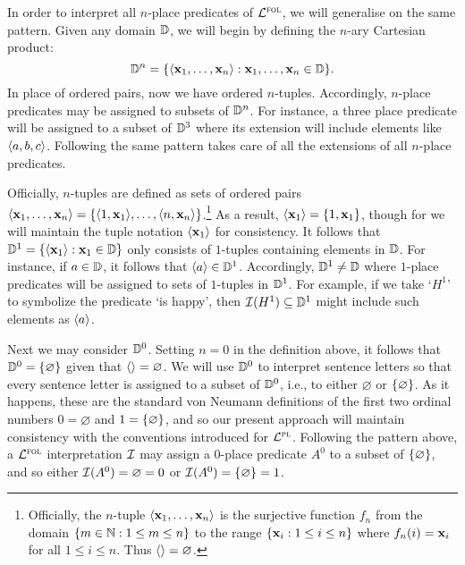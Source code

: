 In order to interpret all $n$-place predicates of $\mathcal{L}^{\textsc{fol}}$, we will generalise on the same pattern.
Given any domain $\mathbb{D}$, we will begin by defining the $n$-ary Cartesian product: 
  $$ \mathbb{D}^n = \lbrace\langle\mathbf{x}_1,\ldots,\mathbf{x}_n\rangle:\mathbf{x}_1,\ldots,\mathbf{x}_n\in\mathbb{D}\rbrace.$$ %
In place of ordered pairs, now we have ordered $n$-tuples.
Accordingly, $n$-place predicates may be assigned to subsets of $\mathbb{D}^n$.
For instance, a three place predicate will be assigned to a subset of $\mathbb{D}^3$ where its extension will include elements like $\langle a,b,c\rangle$.
Following the same pattern takes care of all the extensions of all $n$-place predicates.

Officially, $n$-tuples are defined as sets of ordered pairs $\langle\mathbf{x}_1,\ldots,\mathbf{x}_n\rangle=\lbrace\langle1,\mathbf{x}_1\rangle,\ldots,\langle n,\mathbf{x}_n\rangle\rbrace$.\footnote{Officially, the $n$-tuple $\langle\mathbf{x}_1,\ldots,\mathbf{x}_n\rangle$ is the surjective function $f_n$ from the domain $\lbrace m\in\mathbb{N}:1\leq m\leq n\rbrace$ to the range $\lbrace\mathbf{x}_i:1\leq i\leq n\rbrace$ where $f_n(i)=\mathbf{x}_i$ for all $1\leq i\leq n$. Thus $\langle\rangle=\varnothing$.}
As a result, $\langle\mathbf{x}_1\rangle=\lbrace1,\mathbf{x}_1\rbrace$, though for we will maintain the tuple notation $\langle\mathbf{x}_1\rangle$ for consistency.
It follows that $\mathbb{D}^1=\lbrace\langle\mathbf{x}_1\rangle:\mathbf{x}_1\in\mathbb{D}\rbrace$ only consists of $1$-tuples containing elements in $\mathbb{D}$.
For instance, if $a\in \mathbb{D}$, it follows that $\langle a\rangle\in\mathbb{D}^1$.
Accordingly, $\mathbb{D}^1\neq\mathbb{D}$ where $1$-place predicates will be assigned to sets of $1$-tuples in $\mathbb{D}^1$.
For example, if we take `$H^1$' to symbolize the predicate `is happy', then $\mathcal{I}(H^1)\subseteq\mathbb{D}^1$ might include such elements as $\langle a\rangle$.

Next we may consider $\mathbb{D}^0$. 
Setting $n=0$ in the definition above, it follows that $\mathbb{D}^0=\lbrace\varnothing\rbrace$ given that $\langle\rangle=\varnothing$.
We will use $\mathbb{D}^0$ to interpret sentence letters so that every sentence letter is assigned to a subset of $\mathbb{D}^0$, i.e., to either $\varnothing$ or $\lbrace\varnothing\rbrace$.
As it happens, these are the standard von Neumann definitions of the first two ordinal numbers $0=\varnothing$ and $1=\lbrace\varnothing\rbrace$, and so our present approach will maintain consistency with the conventions introduced for $\mathcal{L}^{\textsc{pl}}$.
Following the pattern above, a $\mathcal{L}^{\textsc{fol}}$ interpretation $\mathcal{I}$ may assign a 0-place predicate $A^0$ to a subset of $\lbrace\varnothing\rbrace$, and so either $\mathcal{I}(A^0)=\varnothing=0$ or $\mathcal{I}(A^0)=\lbrace\varnothing\rbrace=1$.

